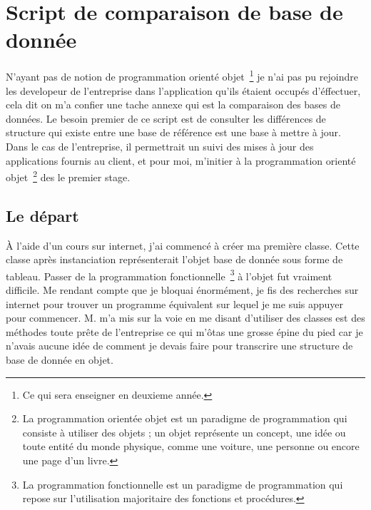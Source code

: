\chapter{Script de comparaison de base de donnée}

N'ayant pas de notion de programmation orienté objet\, \footnote{Ce qui sera
enseigner en deuxieme année.} je n'ai pas pu rejoindre les developeur de
l'entreprise dans l'application qu'ils étaient occupés d'éffectuer, cela dit on
m'a confier une tache annexe qui est la comparaison des bases de données.
Le besoin premier de ce script est de consulter les différences de structure qui
existe entre une base de référence est une base à mettre à jour. Dans le cas de
l'entreprise, il permettrait un suivi des mises à jour des applications fournis
au client, et pour moi, m'initier à la programmation orienté objet\,
\footnote{La programmation orientée objet est un paradigme de programmation qui
consiste à utiliser des objets ; un objet représente un concept, une idée ou
toute entité du monde physique, comme une voiture, une personne ou encore une
page d'un livre.} des le premier stage.

\section{Le départ}

À l'aide d'un cours sur internet, j'ai commencé à créer ma première classe.
Cette classe après instanciation représenterait l'objet \og{} base de donnée
\fg{} sous forme de tableau.
Passer de la programmation fonctionnelle\, \footnote{La programmation
fonctionnelle est un paradigme de programmation qui repose sur l'utilisation
majoritaire des fonctions et procédures.} à l'objet fut vraiment difficile. Me
rendant compte que je bloquai énormément, je fis des recherches sur internet
pour trouver un programme équivalent sur lequel je me suis appuyer pour
commencer. M. m'a mis sur la voie en me disant d'utiliser des classes
est des méthodes toute prête de l'entreprise ce qui m'ôtas une grosse épine du
pied car je n'avais aucune idée de comment je devais faire pour transcrire une
structure de base de donnée en objet.

